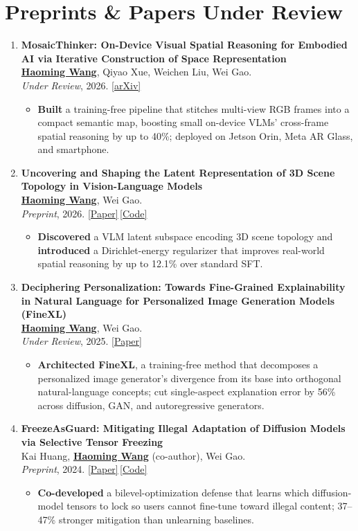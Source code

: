 \documentclass[11pt, letterpaper]{article}
\newenvironment{publistcont}{
  \begin{enumerate}[resume*=pubs]
}{\end{enumerate}}
\newcommand{\impactbullet}[1]{%
  \par\vspace{1pt}%
  \begin{itemize}[leftmargin=1.2em, topsep=0pt, itemsep=0pt, parsep=0pt, partopsep=0pt]
    \item #1
  \end{itemize}}
\newcommand{\me}{\underline{\textbf{Haoming Wang}}}
\newcommand{\meco}{\underline{\textbf{Haoming Wang}} (co-author)}
\begin{document}
\section{Preprints \& Papers Under Review}

\begin{publistcont}
\item\label{pub:mosaic} \textbf{MosaicThinker: On-Device Visual Spatial Reasoning for Embodied AI via Iterative Construction of Space Representation}\\
\me, Qiyao Xue, Weichen Liu, Wei Gao.\\
\textit{Under Review}, 2026. \href{https://www.arxiv.org/abs/2602.07082}{[arXiv]}
\impactbullet{\textbf{Built} a training-free pipeline that stitches multi-view RGB frames into a compact semantic map, boosting small on-device VLMs' cross-frame spatial reasoning by up to 40\%; deployed on Jetson Orin, Meta AR Glass, and smartphone.}

\item\label{pub:vlmlatent} \textbf{Uncovering and Shaping the Latent Representation of 3D Scene Topology in Vision-Language Models}\\
\me, Wei Gao.\\
\textit{Preprint}, 2026. \href{https://haomingwang645.github.io/pdfs/arxiv26_vlm_latent_shaping.pdf}{[Paper]}\,\href{https://github.com/pittisl/vlm-latent-shaping}{[Code]}
\impactbullet{\textbf{Discovered} a VLM latent subspace encoding 3D scene topology and \textbf{introduced} a Dirichlet-energy regularizer that improves real-world spatial reasoning by up to 12.1\% over standard SFT.}

\item\label{pub:finexl} \textbf{Deciphering Personalization: Towards Fine-Grained Explainability in Natural Language for Personalized Image Generation Models (FineXL)}\\
\me, Wei Gao.\\
\textit{Under Review}, 2025. \href{https://haomingwang645.github.io/pdfs/finexl_paper.pdf}{[Paper]}
\impactbullet{\textbf{Architected FineXL}, a training-free method that decomposes a personalized image generator's divergence from its base into orthogonal natural-language concepts; cut single-aspect explanation error by 56\% across diffusion, GAN, and autoregressive generators.}

\item\label{pub:freeze} \textbf{FreezeAsGuard: Mitigating Illegal Adaptation of Diffusion Models via Selective Tensor Freezing}\\
Kai Huang, \meco, Wei Gao.\\
\textit{Preprint}, 2024. \href{https://haomingwang645.github.io/pdfs/freezeasguard_paper.pdf}{[Paper]}\,\href{https://github.com/pittisl/FreezeAsGuard}{[Code]}
\impactbullet{\textbf{Co-developed} a bilevel-optimization defense that learns which diffusion-model tensors to lock so users cannot fine-tune toward illegal content; 37--47\% stronger mitigation than unlearning baselines.}


\end{publistcont}
\end{document}
